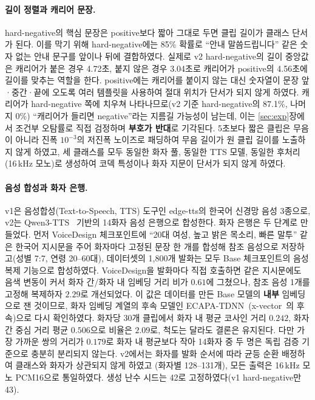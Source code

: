 \documentclass[10pt,twocolumn]{article}
\renewcommand{\emph}[1]{\textbf{#1}}
\begin{document}
\paragraph{길이 정렬과 캐리어 문장.}
hard-negative의 핵심 문장은 positive보다 짧아 그대로 두면 클립 길이가 클래스 단서가 된다.
이를 막기 위해 hard-negative에는 85\% 확률로 ``안내 말씀드립니다'' 같은 숫자 없는 안내 문구를
앞이나 뒤에 결합하였다. 실제로 v2 hard-negative의 길이 중앙값은 캐리어가 붙은 경우 4.72초,
붙지 않은 경우 3.04초로 캐리어가 positive의 4.56초에 길이를 맞추는 역할을 한다. positive에는
캐리어를 붙이지 않는 대신 숫자열이 문장 앞·중간·끝에 오도록 여러 템플릿을 사용하여 절대
위치가 단서가 되지 않게 하였다. 캐리어가 hard-negative 쪽에 치우쳐 나타나므로(v2 기준
hard-negative의 87.1\%, 나머지 0\%) ``캐리어가 들리면 negative''라는 지름길 가능성이 남는데,
이는 \ref{sec:exp}장에서 조건부 오탐률로 직접 검정하며 \emph{부호가 반대}로 기각된다. 5초보다
짧은 클립은 무음이 아니라 진폭 $10^{-3}$의 저진폭 노이즈로 패딩하여 무음 길이가 원 클립
길이를 노출하지 않게 하였고, 세 클래스를 모두 동일한 화자 풀, 동일한 TTS 모델, 동일한
후처리(16\,kHz 모노)로 생성하여 코덱 특성이나 화자 지문이 단서가 되지 않게 하였다.

\paragraph{음성 합성과 화자 은행.}
v1은 음성합성(Text-to-Speech, TTS) 도구인 edge-tts의 한국어 신경망 음성 3종으로,
v2는 Qwen3-TTS~\cite{hu2026qwen3tts} 기반의
14화자 음성 은행으로 합성한다. 화자 은행은 두 단계로 만들었다. 먼저 VoiceDesign 체크포인트에
``20대 여성, 높고 밝은 목소리, 빠른 말투'' 같은 한국어 지시문을 주어 화자마다 고정된 문장 한
개를 합성해 참조 음성으로 저장하고(성별 7:7, 연령 20--60대), 데이터셋의 1{,}800개 발화는 모두
Base 체크포인트의 음성 복제 기능으로 합성하였다. VoiceDesign을 발화마다 직접 호출하면 같은
지시문에도 음색 변동이 커서 화자 간/화자 내 임베딩 거리 비가 $0.61$에 그쳤으나, 참조 음성
1개를 고정해 복제하자 $2.29$로 개선되었다. 이 값은 데이터를 만든 Base 모델의 \emph{내부}
임베딩으로 잰 것이므로, 화자 임베딩 계열의 후속 모델인
ECAPA-TDNN~\cite{desplanques2020ecapa}(x-vector~\cite{snyder2018xvector}의 후속)으로 다시
확인하였다. 화자당 30개 클립에서 화자 내 평균 코사인 거리 $0.242$, 화자 간 중심 거리 평균
$0.506$으로 비율은 $2.09$로, 척도는 달라도 결론은 유지된다. 다만 가장 가까운 쌍의 거리가
$0.179$로 화자 내 평균보다 작아 14화자 중 두 명은 독립 검증 기준으로 충분히 분리되지 않는다.
v2에서는 화자를 발화 순서에 따라 균등 순환 배정하여 클래스와 화자가 상관되지 않게 하였고
(화자별 128--131개), 모든 출력은 16\,kHz 모노 PCM16으로 통일하였다. 생성 난수 시드는 42로
고정하였다(v1 hard-negative만 43).
\end{document}
